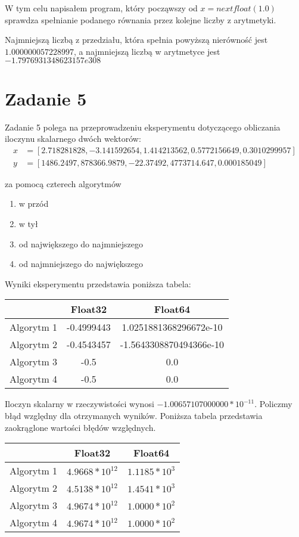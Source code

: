 \documentclass[12pt]{article}
\begin{document}
W tym celu napisałem program, który począwszy od $x = nextfloat(1.0)$ sprawdza spełnianie podanego równania przez kolejne liczby z arytmetyki.

Najmniejszą liczbą z przedziału, która spełnia powyższą nierówność jest $1.000000057228997$, a najmniejszą liczbą w arytmetyce jest $-1.7976931348623157e308$

\section{Zadanie 5}
Zadanie 5 polega na przeprowadzeniu eksperymentu dotyczącego obliczania iloczynu skalarnego dwóch wektorów: 
\begin{align*}
	x &= [2.718281828,-3.141592654,1.414213562,0.5772156649,0.3010299957] \\
	y &= [1486.2497,878366.9879,-22.37492,4773714.647,0.000185049]
\end{align*}

za pomocą czterech algorytmów
\begin{enumerate}
	\item w przód
	\item w tył
	\item od największego do najmniejszego
	\item od najmniejszego do największego
\end{enumerate}

Wyniki eksperymentu przedstawia poniższa tabela:
\begin{table}[h!]
	\centering
    \label{tab:table1}
    \begin{tabular}{|c|c|c|}
    		\hline
      	& Float32 & Float64\\
      	\hline
      	Algorytm 1 & -0.4999443 & 1.0251881368296672e-10\\
		\hline
      	Algorytm 2 & -0.4543457 & -1.5643308870494366e-10\\
		\hline
      	Algorytm 3 & -0.5 & 0.0\\
		\hline
      	Algorytm 4 & -0.5 & 0.0\\
		\hline
    \end{tabular}
\end{table}

Iloczyn skalarny w rzeczywistości wynosi $-1.00657107000000*10^{-11}$. Policzmy błąd względny dla otrzymanych wyników. Poniższa tabela przedstawia zaokrąglone wartości błędów względnych.
\begin{table}[h!]
	\centering
    \label{tab:table1}
    \begin{tabular}{|c|c|c|}
    		\hline
      	& Float32 & Float64\\
      	\hline
      	Algorytm 1 & $4.9668 * 10^{12}$ & $1.1185 * 10^3$\\
		\hline
      	Algorytm 2 & $4.5138 * 10^{12}$ & $1.4541 * 10^3$\\
		\hline
      	Algorytm 3 & $4.9674 * 10^{12}$ & $1.0000 * 10^2$\\
		\hline
      	Algorytm 4 & $4.9674 * 10^{12}$ & $1.0000 * 10^2$\\
		\hline
    \end{tabular}
\end{table}
\end{document}
